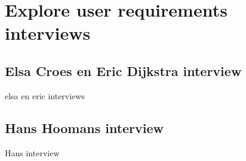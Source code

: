 \chapter{Explore user requirements interviews}
\label{appendix:ExploreUserRequirements}
\section{Elsa Croes en Eric Dijkstra interview}
\label{appendix:ExploreUserRequirementsElsa}
elsa en eric interviews
\section{Hans Hoomans interview}
\label{appendix:ExploreUserRequirementsHans}
Hans interview
